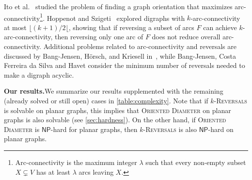 \documentclass[11pt, twoside]{article}
\numberwithin{equation}{section}
\numberwithin{table}{section}
\numberwithin{figure}{section}
\theoremstyle{definition}
\theoremstyle{definition}
\theoremstyle{definition}
\def\NP{\mathsf{NP}}
\begin{document}
Ito et al.~\cite{ito2023monotone} studied the problem of finding a graph orientation that maximizes arc-connectivity\footnote{Arc-connectivity is the maximum integer $\lambda$ such that every non-empty subset $X \subsetneq V$ has at least $\lambda$ arcs leaving $X$.}. Hoppenot and Szigeti~\cite{hoppenot2024reversing} explored digraphs with $k$-arc-connectivity at most $\lfloor (k+1)/2\lfloor$, showing that if reversing a subset of arcs $F$ can achieve $k$-arc-connectivity, then reversing only one arc of $F$ does not reduce overall arc-connectivity. Additional problems related to arc-connectivity and reversals are discussed by Bang-Jensen, H{\"o}rsch, and Kriesell in~\cite{banJensen2023complexity}, while Bang-Jensen, Costa Ferreira da Silva and Havet \cite{BangJensen2022inversion} consider the minimum number of reversals needed to make a digraph acyclic.

\noindent\textbf{Our results.}\quad We summarize our results supplemented with the remaining (already solved or still open) cases in \cref{table:complexity}. Note that if \textsc{$k$-Reversals} is solvable on planar graphs, this implies that \textsc{Oriented Diameter} on planar graphs is also solvable (see \cref{sec:hardness}). On the other hand, if \textsc{Oriented Diameter} is $\NP$-hard for planar graphs, then \textsc{$k$-Reversals} is also $\NP$-hard on planar graphs. 
\end{document}
